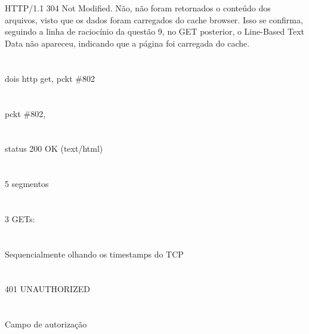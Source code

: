 \documentclass[12pt]{article}
\begin{document}
\section{}
HTTP/1.1 304 Not Modified. Não, não foram retornados o conteúdo dos arquivos, visto que  os dados foram carregados do cache browser. Isso se confirma, seguindo a linha de raciocínio da questão 9, no GET posterior, o Line-Based Text Data não apareceu, indicando que a página foi carregada do cache.
\section{}
dois http get, pckt \#802
\section{}
pckt \#802, 
\section{}
status 200 OK (text/html)
\section{}
5 segmentos
\section{}
3 GETs: 
\section{}
Sequencialmente olhando os timestamps do TCP
\section{}
401 UNAUTHORIZED
\section{}
Campo de autorização
\end{document}
